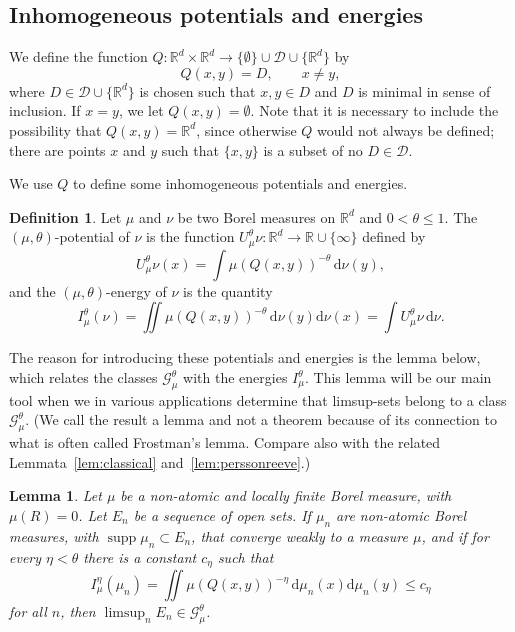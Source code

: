 \documentclass[10pt]{amsart}
\newtheorem{lemm}[theo]{Lemma}\newtheorem{prop}[theo]{Proposition}\newtheorem{coro}[theo]{Corollary}\newtheorem{conj}[theo]{Conjecture}
\theoremstyle{definition}\newtheorem{defi}[theo]{Definition}\newtheorem{rema}[theo]{Remark}\newtheorem{exam}[theo]{Example}\newtheorem{exem}[theo]{Example}\newtheorem{nota}[theo]{Notation}
\DeclareMathOperator{\supp}{supp}
\newcommand*{\dd}{\mathrm{d}}
\begin{document}
\subsection{Inhomogeneous potentials and energies} \label{sec:inhomogeneous}

We define the function $Q \colon \mathbb{R}^d \times \mathbb{R}^d \to \{\emptyset \} \cup \mathscr{D} \cup \{\mathbb{R}^d\}$ by
\[
Q (x,y) = D, \qquad x \neq y,
\]
where $D \in \mathscr{D} \cup \{ \mathbb{R}^d \}$ is chosen such that $x,y \in D$ and $D$ is minimal in sense of inclusion. If $x = y$, we let $Q (x,y) = \emptyset$. Note that it is necessary to include the possibility that $Q (x,y) = \mathbb{R}^d$, since otherwise $Q$ would not always be defined; there are points $x$ and $y$ such that $\{x, y\}$ is a subset of no $D \in \mathscr{D}$.

We use $Q$ to define some inhomogeneous potentials and energies.

\begin{defi}
Let $\mu$ and $\nu$ be two Borel measures on $\mathbb{R}^d$ and $0 < \theta \leq 1$. The $(\mu, \theta)$-potential of $\nu$ is the function $U_\mu^\theta \nu \colon \mathbb{R}^d \to \mathbb{R} \cup \{\infty\}$ defined by
\[
U_\mu^\theta \nu (x) = \int \mu (Q(x,y))^{-\theta} \, \dd \nu (y),
\]
and the $(\mu,\theta)$-energy of $\nu$ is the quantity
\[
I_\mu^\theta (\nu) = \iint \mu (Q(x,y))^{-\theta} \, \dd \nu (y) \dd \nu (x) = \int U_\mu^\theta \nu \, \dd \nu.
\]
\end{defi}

The reason for introducing these potentials and energies is the lemma below, which relates the classes $\mathscr{G}_\mu^\theta$ with the energies $I_\mu^\theta$. This lemma will be our main tool when we in various applications determine that limsup-sets belong to a class $\mathscr{G}_\mu^\theta$. (We call the result a lemma and not a theorem because of its connection to what is often called Frostman's lemma. Compare also with the related Lemmata~\ref{lem:classical} and~\ref{lem:perssonreeve}.)

\begin{lemm}\label{lem:frostman}
Let $\mu$ be a non-atomic and locally finite Borel measure, with $\mu (R) = 0$. Let $E_n$ be a sequence of open sets. If $\mu_n$ are non-atomic Borel measures, with $\supp \mu_n \subset E_n$, that converge weakly to a measure $\mu$, and if for every $\eta < \theta$ there is a constant $c_\eta$ such that
\[
I_\mu^\eta (\mu_n) = \iint \mu (Q(x,y))^{-\eta} \, \dd \mu_n (x) \dd \mu_n (y) \leq c_\eta
\]
for all $n$, then $\limsup_n E_n \in \mathscr{G}_\mu^\theta$.
\end{lemm}
\end{document}
